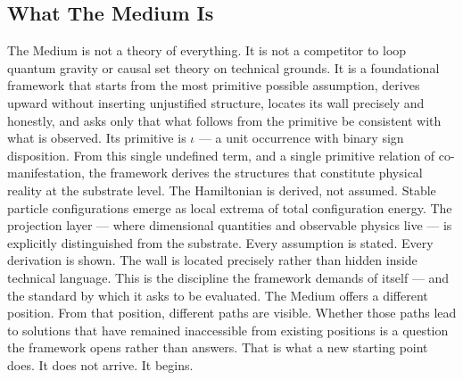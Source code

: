 \documentclass[11pt,letterpaper]{article}
\begin{document}
\subsection{What The Medium Is}
\label{sec:org2ec2d03}
The Medium is not a theory of everything. It is not a competitor to loop quantum gravity or causal set theory on technical grounds. It is a foundational framework that starts from the most primitive possible assumption, derives upward without inserting unjustified structure, locates its wall precisely and honestly, and asks only that what follows from the primitive be consistent with what is observed.
Its primitive is \(\iota\) — a unit occurrence with binary sign disposition. From this single undefined term, and a single primitive relation of co-manifestation, the framework derives the structures that constitute physical reality at the substrate level. The Hamiltonian is derived, not assumed. Stable particle configurations emerge as local extrema of total configuration energy. The projection layer — where dimensional quantities and observable physics live — is explicitly distinguished from the substrate.
Every assumption is stated. Every derivation is shown. The wall is located precisely rather than hidden inside technical language. This is the discipline the framework demands of itself — and the standard by which it asks to be evaluated.
The Medium offers a different position. From that position, different paths are visible. Whether those paths lead to solutions that have remained inaccessible from existing positions is a question the framework opens rather than answers. That is what a new starting point does. It does not arrive. It begins.
\end{document}
